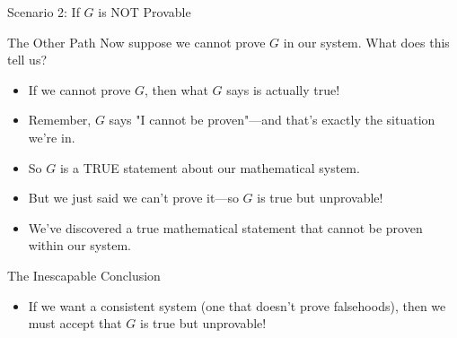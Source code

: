 \documentclass[aspectratio=169]{beamer}
\begin{document}
\begin{frame}{Scenario 2: If $G$ is NOT Provable}

\begin{alertblock}{The Other Path}
Now suppose we cannot prove $G$ in our system. What does this tell us?
\end{alertblock}

\begin{itemize}
    \item If we cannot prove $G$, then what $G$ says is actually true!
    \item Remember, $G$ says "I cannot be proven"—and that's exactly the situation we're in.
    \item So $G$ is a TRUE statement about our mathematical system.
    \item But we just said we can't prove it—so $G$ is true but unprovable!
    \item We've discovered a true mathematical statement that cannot be proven within our system.
\end{itemize}

\end{frame}

\begin{frame}{The Inescapable Conclusion}

\begin{center}
\end{center}

\begin{itemize}
    \item If we want a consistent system (one that doesn't prove falsehoods), then we must accept that $G$ is true but unprovable!
\end{itemize}

\end{frame}
\end{document}
